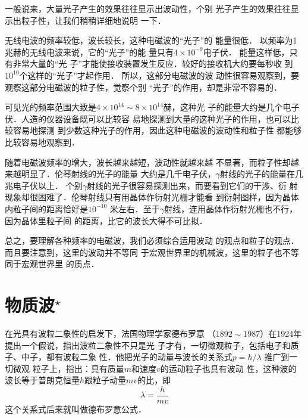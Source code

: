 一般说来，大量光子产生的效果往往显示出波动性，个别
光子产生的效果往往显示出粒子性，让我们稍稍详细地说明
一下．

无线电波的频率较低，波长较长，这种电磁波的“光子”的
能量很低．
以频率为1兆赫的无线电波来说，它的“光子”的能
量只有$4\times10^{-9}$电子伏．
能量这样低，只有非常大量的“光
子”才能使接收装置发生反应．较好的接收机大约要每秒收
到$10^{10}$个这样的“光子”才起作用．
所以，这部分电磁波的波
动性很容易观察到，要观察这部分电磁波的粒子性，觉察个别
“光子”的作用，却是非常不容易的．

可见光的频率范围大致是$4\times10^{14} \sim 8\times10^{14}$赫，这种光
子的能量大约是几个电子伏．人造的仪器设备既可以比较容
易地探测到大量的这种光子的作用，也可以比较容易地探测
到少数这种光子的作用，因此这种电磁波的波动性和粒子性
都能够比较容易地观察到．

随着电磁波频率的增大，波长越来越短，波动性就越来越
不显著，而粒子性却越来越明显了．伦琴射线的光子的能量
大约是几千电子伏，$\gamma$射线的光子的能量在几兆电子伏以上．
个别$\gamma$射线的光子很容易探测出来，而要看到它们的干涉、衍
射现象却很困难了．伦琴射线只有用晶体作衍射光栅才能看
到衍射图样，因为晶体内粒子间的距离恰好是$10^{-10}$
米左右．至于$\gamma$射线，连用晶体作衍射光栅也不行，因为晶体里粒子间
的距离，比它的波长大得不可比拟．

总之，要理解各种频率的电磁波，我们必须综合运用波动
的观点和粒子的观点．
而且要注意到，这里的波动并不等同
于宏观世界里的机械波，这里的粒子也不等同于宏观世界里
的质点．

\section{物质波$^\star$}
在光具有波粒二象性的启发下，法国物理学家德布罗意
（$1892 \sim 1987$）在1924年提出一个假说，指出波粒二象性不只是光
子才有，一切微观粒子，包括电子和质子、中子，都有波粒二象
性．他把光子的动量与波长的关系式$p=h/\lambda$
推广到一切微观
粒子上，指出：具有质量$m$和速度$v$的运动粒子也具有波动
性，这种波的波长等于普朗克恒量$h$跟粒子动量$mv$的比，即
\[\lambda=\frac{h}{mv} \]
这个关系式后来就叫做德布罗意公式．

